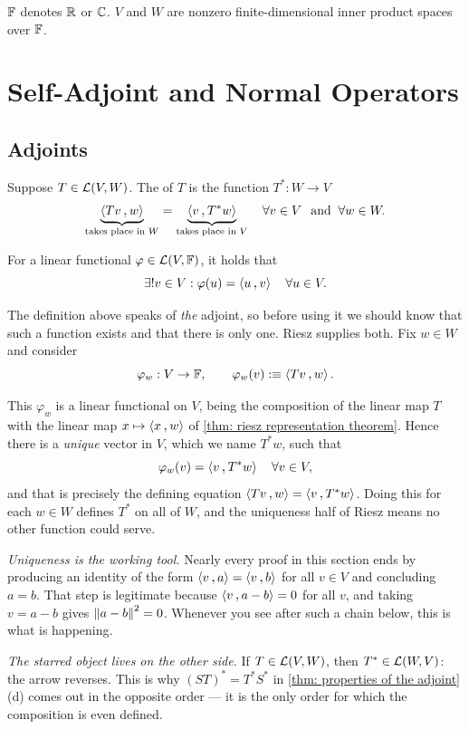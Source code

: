 $\mathbb{F}$ denotes $\mathbb{R}$ or $\mathbb{C}$. $V$ and $W$ are nonzero finite-dimensional inner product spaces over $\mathbb{F}$.

\section{Self-Adjoint and Normal Operators}

\subsection{Adjoints}


\begin{mydef}[adjoint, $T^*$]
  Suppose $T\in \mathcal{L}(V,W)$. The  of $T$ is the function $T^{*}: W \to V$ \st
  \[
    \underbrace{\ip{Tv}{w}}_{\text{takes place in $W$}} = \underbrace{\ip{v}{T^{*}w}}_{\text{takes place in $V$}} \quad \forall v \in V \myand \forall w \in W.
  \]
\end{mydef}

 For a linear functional $\varphi \in \mathcal{L} (V, \mathbb{F})$, it holds that
\[
  \exists ! v \in V: \varphi(u) = \ip{u}{v} \quad \forall u \in V.
\]

The definition above speaks of \emph{the} adjoint, so before using it we should know that such a function exists and that there is only one. Riesz supplies both. Fix $w \in W$ and consider
\[
  \varphi_w : V \to \myF, \qquad \varphi_w(v) :\equiv \ip{Tv}{w}.
\]

This $\varphi_w$ is a linear functional on $V$, being the composition of the linear map $T$ with the linear map $x \mapsto \ip{x}{w}$ of \ref{thm: riesz representation theorem}. Hence there is a \emph{unique} vector in $V$, which we name $T^{*}w$, such that
\[
  \varphi_w(v) = \ip{v}{T^{*}w} \quad \forall v \in V,
\]
and that is precisely the defining equation $\ip{Tv}{w} = \ip{v}{T^{*}w}$. Doing this for each $w \in W$ defines $T^{*}$ on all of $W$, and the uniqueness half of Riesz means no other function could serve.

\begin{ainote}
  \emph{Uniqueness is the working tool.} Nearly every proof in this section ends by producing an identity of the form $\ip{v}{a} = \ip{v}{b}$ for all $v \in V$ and concluding $a = b$. That step is legitimate because $\ip{v}{a-b} = 0$ for all $v$, and taking $v = a-b$ gives $\left \lVert a-b \right \rVert^2 = 0$. Whenever you see \qt{$\implies$} after such a chain below, this is what is happening.

  \emph{The starred object lives on the other side.} If $T \in {\mathcal{L}(V,W)}$, then $T^{*} \in \mathcal{L}(W,V)$: the arrow reverses. This is why $(ST)^{*} = T^{*}S^{*}$ in \ref{thm: properties of the adjoint}(d) comes out in the opposite order --- it is the only order for which the composition is even defined.
\end{ainote}

